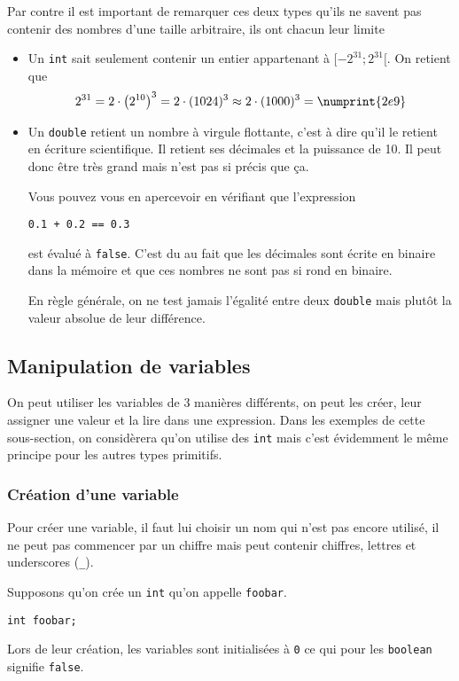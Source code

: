 Par contre il est important de remarquer ces deux types qu'ils ne savent
pas contenir des nombres d'une taille arbitraire, ils ont chacun leur limite
\begin{itemize}
  \item Un \verb|int| sait seulement contenir un entier appartenant à
    $[-2^{31}; 2^{31}[$. On retient que
    \[ 2^{31} = 2 \cdot \left(2^{10}\right)^3 = 2 \cdot (1024)^3
    \approx 2 \cdot (1000)^3 = \numprint{2e9} \]
  \item Un \verb|double| retient un nombre à virgule flottante, c'est à dire
    qu'il le retient en écriture scientifique.
    Il retient ses décimales et la puissance de 10.
    Il peut donc être très grand mais n'est pas si précis que ça.

    Vous pouvez vous en apercevoir en vérifiant que l'expression
    \begin{lstlisting}
0.1 + 0.2 == 0.3
    \end{lstlisting}
    est évalué à \verb|false|.
    C'est du au fait que les décimales sont écrite en binaire dans la mémoire
    et que ces nombres ne sont pas si rond en binaire.

    En règle générale, on ne test jamais l'égalité entre deux \verb|double|
    mais plutôt la valeur absolue de leur différence.
\end{itemize}

\subsection{Manipulation de variables}
On peut utiliser les variables de 3 manières différents, on peut les créer,
leur assigner une valeur et la lire dans une expression.
Dans les exemples de cette sous-section, on considèrera qu'on utilise des
\verb|int| mais c'est évidemment le même principe pour les autres types
primitifs.

\subsubsection{Création d'une variable}
Pour créer une variable, il faut lui choisir un nom qui n'est pas encore
utilisé, il ne peut pas commencer par un chiffre mais peut contenir chiffres,
lettres et underscores (\verb|_|).

Supposons qu'on crée un \verb|int| qu'on appelle \verb|foobar|.
\begin{lstlisting}
int foobar;
\end{lstlisting}
Lors de leur création, les variables sont initialisées à \verb|0| ce qui pour
les \verb|boolean| signifie \verb|false|.


